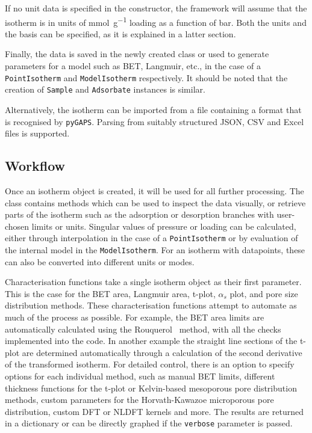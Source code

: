 If no unit data is specified in the constructor, the framework will
assume that the isotherm is in units of \si{\milli\mole\per\gram} 
loading as a function of \si{\bar}. Both the units and the basis 
can be specified, as it is explained in a latter section.

Finally, the data is saved in the newly created class or used to
generate parameters for a model such as BET, Langmuir, etc.,
in the case of a \texttt{PointIsotherm} and
\texttt{ModelIsotherm} respectively. It should be noted that the creation of
\texttt{Sample} and \texttt{Adsorbate} instances is similar.

Alternatively, the isotherm can be imported from a file containing 
a format that is recognised by \texttt{pyGAPS}. Parsing from 
suitably structured JSON, CSV and Excel files is supported.

\subsection{Workflow}

Once an isotherm object is created, it will be used for all 
further processing. The class contains methods which can be 
used to inspect the data visually, or retrieve
parts of the isotherm such as the adsorption or desorption branches with
user-chosen limits or units. Singular values of pressure or 
loading can be calculated, either through interpolation in the
case of a \texttt{PointIsotherm} or by evaluation
of the internal model in the \texttt{ModelIsotherm}. For an isotherm with
datapoints, these can also be converted into different units or modes.

Characterisation functions take a single isotherm object as their
first parameter. This is the case for the BET area, Langmuir area, 
t-plot, \(\alpha_s\) plot, and pore size distribution methods.
These characterisation functions attempt to automate as much
of the process as possible. For example, the BET area limits are
automatically calculated using the 
Rouquerol~\cite{rouquerolAdsorptionPowdersPorous2013} method, 
with all the checks implemented into the code. In another example
the straight line sections of the t-plot are determined automatically
through a calculation of the second derivative of the transformed isotherm.
For detailed control, there is an option to specify
options for each individual method, such as manual BET limits, 
different thickness functions for the t-plot or Kelvin-based 
mesoporous pore distribution methods, custom parameters for the
Horvath-Kawazoe microporous pore distribution, custom
DFT or NLDFT kernels and more. The results are returned in a 
dictionary or can be directly graphed if the \texttt{verbose} 
parameter is passed.

